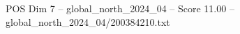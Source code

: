 \begin{textsample}{POS Dim 7 – global\_north\_2024\_04 – Score 11.00 – global\_north\_2024\_04/200384210.txt}
\end{textsample}

